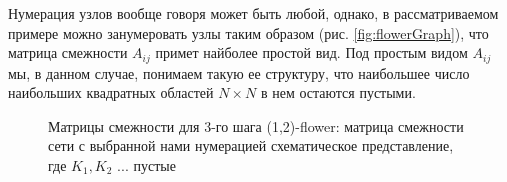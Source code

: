 \documentclass[10pt,aps,pra]{revtex4-1}
\begin{document}
        Нумерация узлов вообще говоря может быть любой, однако, в рассматриваемом примере можно занумеровать узлы таким образом (рис. \ref{fig:flowerGraph}), что матрица смежности $A_{ij}$ примет найболее простой вид. Под простым видом $A_{ij}$ мы, в данном случае, понимаем такую ее структуру, что наибольшее число наибольших квадратных областей $N \times N$ в нем остаются пустыми.

            \begin{figure}[H]  
                \centering

                \caption{
                    \label{fig:flowerMatrix}
                    Матрицы смежности для 3-го шага (1,2)-flower:
                      матрица смежности сети с выбранной нами нумерацией
                     схематическое представление, где $K_1, K_2$ ... пустые
                }
            \end{figure}
\end{document}
